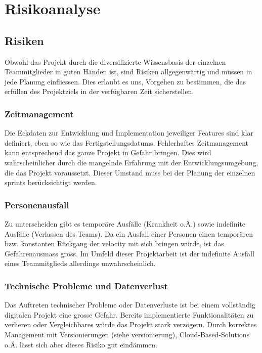 \documentclass[../main.tex]{subfiles}
\begin{document}
	\section{Risikoanalyse}
	\subsection{Risiken}
	\par Obwohl das Projekt durch die diversifizierte Wissensbasis der einzelnen Teammitglieder in guten Händen ist, sind Risiken allgegenwärtig und müssen in jede Planung einfliessen. Dies erlaubt es uns, Vorgehen zu bestimmen, die das erfüllen des Projektziels in der verfügbaren Zeit sicherstellen. 
	
	\subsubsection{Zeitmanagement}
	\par Die Eckdaten zur Entwicklung und Implementation jeweiliger Features sind klar definiert, eben so wie das Fertigstellungsdatums. Fehlerhaftes Zeitmanagement kann entsprechend das ganze Projekt in Gefahr bringen. Dies wird wahrscheinlicher durch die mangelnde Erfahrung mit der Entwicklungsumgebung, die das Projekt voraussetzt. Dieser Umstand muss bei der Planung der einzelnen \glspl{sprint} berücksichtigt werden.
	
	\subsubsection{Personenausfall}
	\par Zu unterscheiden gibt es temporäre Ausfälle (Krankheit o.Ä.) sowie indefinite Ausfälle (Verlassen des Teams). Da ein Ausfall einer Personen einen temporären bzw. konstanten Rückgang der \gls{velocity} mit sich bringen würde, ist das Gefahrenausmass gross. Im Umfeld dieser Projektarbeit ist der indefinite Ausfall eines Teammitglieds allerdings unwahrscheinlich.
	
	\subsubsection{Technische Probleme und Datenverlust}
	\par Das Auftreten technischer Probleme oder Datenverluste ist bei einem vollständig digitalen Projekt eine grosse Gefahr. Bereits implementierte Funktionalitäten zu verlieren oder Vergleichbares würde das Projekt stark verzögern. Durch korrektes Management mit Versionierungen (siehe \gls{versionierung}), Cloud-Based-Solutions o.Ä. lässt sich aber dieses Risiko gut eindämmen.
	
\end{document}
